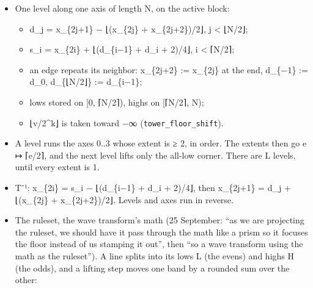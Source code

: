 \begin{itemize}
\item One level along one axis of length N, on the active block:

\begin{itemize}
\item d\_\allowbreak{}j = x\_\allowbreak{}\{2j+1\} − ⌊(x\_\allowbreak{}\{2j\} + x\_\allowbreak{}\{2j+2\})/2⌋, j < ⌊N/2⌋;
\item s\_\allowbreak{}i = x\_\allowbreak{}\{2i\} + ⌊(d\_\allowbreak{}\{i−1\} + d\_\allowbreak{}i + 2)/4⌋, i < ⌈N/2⌉;
\item an edge repeats its neighbor: x\_\allowbreak{}\{2j+2\} := x\_\allowbreak{}\{2j\} at the end, d\_\allowbreak{}\{−1\} := d\_\allowbreak{}0, d\_\allowbreak{}\{⌊N/2⌋\} := d\_\allowbreak{}\{i−1\};
\item lows stored on [0, ⌈N/2⌉), highs on [⌈N/2⌉, N);
\item ⌊v/2\textasciicircum{}k⌋ is taken toward −∞ (\texttt{tower\_\allowbreak{}floor\_\allowbreak{}shift}).
\end{itemize}
\item A level runs the axes 0..3 whose extent is ≥ 2, in order. The extents then go e ↦ ⌈e/2⌉, and the next level lifts only the all-low corner. There are L levels, until every extent is 1.
\item T⁻¹: x\_\allowbreak{}\{2i\} = s\_\allowbreak{}i − ⌊(d\_\allowbreak{}\{i−1\} + d\_\allowbreak{}i + 2)/4⌋, then x\_\allowbreak{}\{2j+1\} = d\_\allowbreak{}j + ⌊(x\_\allowbreak{}\{2j\} + x\_\allowbreak{}\{2j+2\})/2⌋. Levels and axes run in reverse.
\item The ruleset, the wave transform's math (25 September: “as we are projecting the ruleset, we should have it pass through the math like a prism so it focuses the floor instead of us stamping it out”, then “so a wave transform using the math as the ruleset”). A line splits into its lows L (the evens) and highs H (the odds), and a lifting step moves one band by a rounded sum over the other:


\end{itemize}
